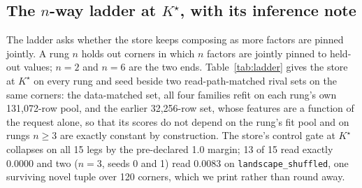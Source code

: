 \documentclass{article} %
\newcommand{\Kstar}{\ensuremath{K^{\star}}}
\begin{document}
\subsection{The $n$-way ladder at $\Kstar$, with its inference note}
\label{sec:ladder}

The ladder asks whether the store keeps composing as more factors are pinned jointly. A rung
$n$ holds out corners in which $n$ factors are jointly pinned to held-out values; $n=2$ and
$n=6$ are the two ends. Table~\ref{tab:ladder} gives the store at $\Kstar$ on every rung and
seed beside two read-path-matched rival sets on the same corners: the data-matched set, all four
families refit on each rung's own 131,072-row pool, and the earlier 32,256-row set, whose features %
are a function of the request alone, so that its scores do not depend on the rung's fit pool and on
rungs $n\ge3$ are exactly constant by construction. %
The store's control gate at $\Kstar$ collapses on all 15 legs by the pre-declared 1.0 margin;
13 of 15 read exactly 0.0000 and two ($n=3$, seeds 0 and 1) read 0.0083 on
\texttt{landscape\_shuffled}, one surviving novel tuple over 120 corners, which we print
rather than round away. %
\end{document}
